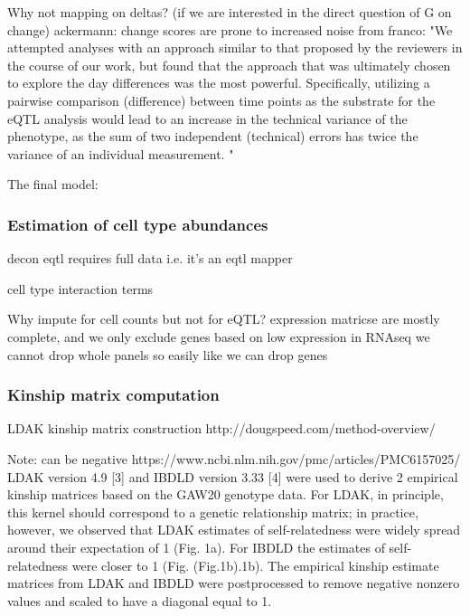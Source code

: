 Why not mapping on deltas? (if we are interested in the direct question of G on change)
ackermann: change scores are prone to increased noise
from franco: "We attempted analyses with an approach similar to that proposed by the reviewers in the course of our work, but found that the approach that was ultimately chosen to explore the day differences was the most powerful. Specifically, utilizing a pairwise comparison (difference) between time points as the substrate for the eQTL analysis would lead to an increase in the technical variance of the phenotype, as the sum of two independent (technical) errors has twice the variance of an individual measurement. "

The final model:

\subsubsection{Estimation of cell type abundances}

decon eqtl
    requires full data i.e. it's an eqtl mapper

cell type interaction terms


Why impute for cell counts but not for eQTL?
expression matricse are mostly complete, and we only exclude genes based on low expression in RNAseq
we cannot drop whole panels so easily like we can drop genes

\subsubsection{Kinship matrix computation}

LDAK kinship matrix construction http://dougspeed.com/method-overview/

Note: can be negative
https://www.ncbi.nlm.nih.gov/pmc/articles/PMC6157025/
LDAK version 4.9 [3] and IBDLD version 3.33 [4] were used to derive 2 empirical kinship matrices based on the GAW20 genotype data. For LDAK, in principle, this kernel should correspond to a genetic relationship matrix; in practice, however, we observed that LDAK estimates of self-relatedness were widely spread around their expectation of 1 (Fig. 1a). For IBDLD the estimates of self-relatedness were closer to 1 (Fig. (Fig.1b).1b). The empirical kinship estimate matrices from LDAK and IBDLD were postprocessed to remove negative nonzero values and scaled to have a diagonal equal to 1.

